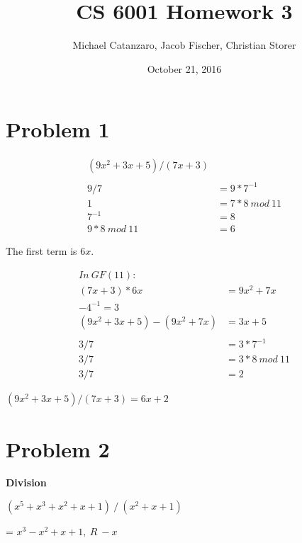 \documentclass[letterpaper]{article}
\title{CS 6001 Homework 3}
\author{Michael Catanzaro, Jacob Fischer, Christian Storer}
\date{October 21, 2016}
\begin{document}
\maketitle

\section{Problem 1}


\begin{equation*}
  \begin{split}
    (9x^2+3x+5) / (7x+3) \\
    \\
    9/7 &= 9*7^{-1} \\
    1 &= 7*8\ mod\ 11 \\
    7^{-1} &= 8 \\
    9*8\ mod\ 11 &= 6
  \end{split}
\end{equation*}

The first term is \(6x\).


\begin{equation*}
  \begin{split}
    In\  GF(11): \\
    (7x+3)*6x &= 9x^2+7x \\
    -4^{-1} = 3 \\
    (9x^2+3x+5) - (9x^2+7x) &= 3x + 5 \\
    \\
    3/7 &= 3*7^{-1} \\
    3/7 &= 3*8\ mod\ 11 \\
    3/7 &= 2
  \end{split}
\end{equation*}

\((9x^2+3x+5) / (7x+3) = 6x + 2\)


\section{Problem 2}

\textbf{Division}

\((x^5 + x^3 + x^2 + x + 1)\ /\ (x^2 + x + 1)\)


= \(x^3 - x^2 + x + 1,\ R\ -x\)
\end{document}
